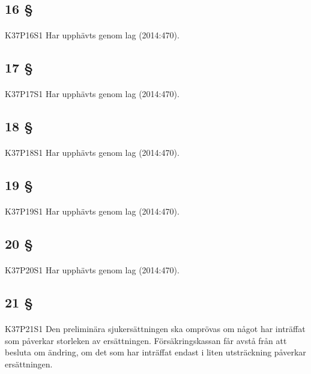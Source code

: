 \documentclass[a4paper,notitlepage,openany,10pt]{book}
\begin{document}
\subsection*{16 §}
\paragraph*{}
{\tiny K37P16S1}
Har upphävts genom
lag (2014:470).
\subsection*{17 §}
\paragraph*{}
{\tiny K37P17S1}
Har upphävts genom
lag (2014:470).
\subsection*{18 §}
\paragraph*{}
{\tiny K37P18S1}
Har upphävts genom
lag (2014:470).
\subsection*{19 §}
\paragraph*{}
{\tiny K37P19S1}
Har upphävts genom
lag (2014:470).
\subsection*{20 §}
\paragraph*{}
{\tiny K37P20S1}
Har upphävts genom
lag (2014:470).
\subsection*{21 §}
\paragraph*{}
{\tiny K37P21S1}
Den preliminära sjukersättningen ska omprövas om något har inträffat som påverkar storleken av ersättningen.
Försäkringskassan får avstå från att besluta om ändring, om det som har inträffat endast i liten utsträckning påverkar ersättningen.
\end{document}
